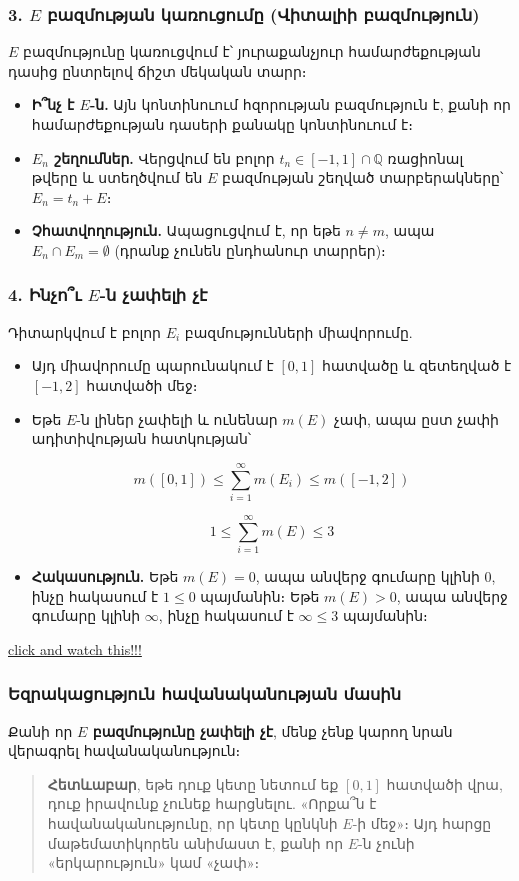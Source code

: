 \documentclass[12pt, a4paper]{article}
\begin{document}
\subsubsection{3. $E$ բազմության կառուցումը (Վիտալիի բազմություն)}

$E$ բազմությունը կառուցվում է՝ յուրաքանչյուր համարժեքության դասից ընտրելով ճիշտ մեկական տարր։

\begin{itemize}
    \item \textbf{Ի՞նչ է $E$-ն.} Այն կոնտինուում հզորության բազմություն է, քանի որ համարժեքության դասերի քանակը կոնտինուում է։
    \item \textbf{$E_n$ շեղումներ.} Վերցվում են բոլոր $t_n \in [-1, 1] \cap \mathbb{Q}$ ռացիոնալ թվերը և ստեղծվում են $E$ բազմության շեղված տարբերակները՝ $E_n = t_n + E$։
    \item \textbf{Չհատվողություն.} Ապացուցվում է, որ եթե $n \neq m$, ապա $E_n \cap E_m = \emptyset$ (դրանք չունեն ընդհանուր տարրեր)։
\end{itemize}

\subsubsection{4. Ինչո՞ւ $E$-ն չափելի չէ}

Դիտարկվում է բոլոր $E_i$ բազմությունների միավորումը.

\begin{itemize}
    \item Այդ միավորումը պարունակում է $[0, 1]$ հատվածը և զետեղված է $[-1, 2]$ հատվածի մեջ։
    \item Եթե $E$-ն լիներ չափելի և ունենար $m(E)$ չափ, ապա ըստ չափի ադիտիվության հատկության՝
    
    $$m([0, 1]) \leq \sum_{i=1}^{\infty} m(E_i) \leq m([-1, 2])$$
    
    $$1 \leq \sum_{i=1}^{\infty} m(E) \leq 3$$
    
    \item \textbf{Հակասություն.} Եթե $m(E) = 0$, ապա անվերջ գումարը կլինի $0$, ինչը հակասում է $1 \leq 0$ պայմանին։ Եթե $m(E) > 0$, ապա անվերջ գումարը կլինի $\infty$, ինչը հակասում է $\infty \leq 3$ պայմանին։
\end{itemize}

\href{https://youtu.be/hs3eDa3_DzU?si=vP_F8auUZv86hVCA}{click and watch this!!!}

\subsubsection{Եզրակացություն հավանականության մասին}

Քանի որ \textbf{$E$ բազմությունը չափելի չէ}, մենք չենք կարող նրան վերագրել հավանականություն։

\begin{quote}
\textbf{Հետևաբար}, եթե դուք կետը նետում եք $[0, 1]$ հատվածի վրա, դուք իրավունք չունեք հարցնելու. «Որքա՞ն է հավանականությունը, որ կետը կընկնի $E$-ի մեջ»։ Այդ հարցը մաթեմատիկորեն անիմաստ է, քանի որ $E$-ն չունի «երկարություն» կամ «չափ»։
\end{quote}
\end{document}

